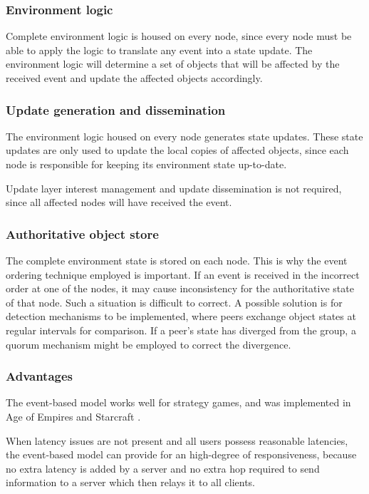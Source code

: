 \subsubsection{Environment logic}
Complete environment logic is housed on every node, since every node must be able to apply the logic to translate any event into a state update. The environment logic will determine a set of objects that will be affected by the received event and update the affected objects accordingly.

\subsubsection{Update generation and dissemination}

The environment logic housed on every node generates state updates. These state updates are only used to update the local copies of affected objects, since each node is responsible for keeping its environment state up-to-date.

Update layer interest management and update dissemination is not required, since all affected nodes will have received the event.

\subsubsection{Authoritative object store}

The complete environment state is stored on each node. This is why the event ordering technique employed is important. If an event is received in the incorrect order at one of the nodes, it may cause inconsistency for the authoritative state of that node. Such a situation is difficult to correct. A possible solution is for detection mechanisms to be implemented, where peers exchange object states at regular intervals for comparison. If a peer's state has diverged from the group, a quorum mechanism might be employed to correct the divergence.

\subsubsection{Advantages}
The event-based model works well for strategy games, and was implemented in Age of Empires \cite{p2p_cm_aoe} and Starcraft \cite{starcraft_network_model}.

When latency issues are not present and all users possess reasonable latencies, the event-based model can provide for an high-degree of responsiveness, because no extra latency is added by a server and no extra hop required to send information to a server which then relays it to all clients.

